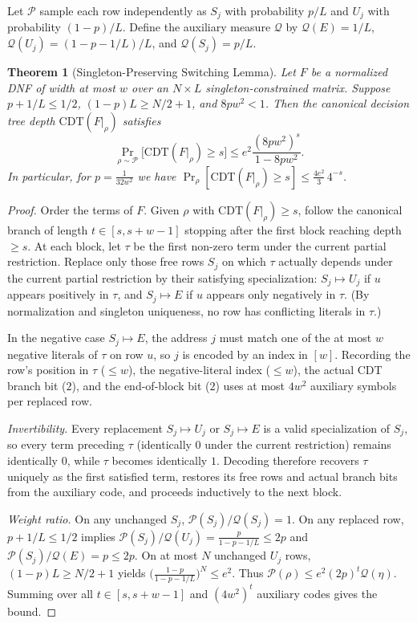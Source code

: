 \documentclass[11pt,a4paper]{article}
\newtheorem{theorem}{Theorem}[section]
\theoremstyle{definition}
\theoremstyle{remark}
\newcommand{\CDT}{\mathrm{CDT}}
\newcommand{\Prb}{\Pr}
\begin{document}
Let $\mathcal{P}$ sample each row independently as $S_j$ with probability $p/L$ and $U_j$ with probability $(1-p)/L$. Define the auxiliary measure $\mathcal{Q}$ by $\mathcal{Q}(E) = 1/L$, $\mathcal{Q}(U_j) = (1 - p - 1/L)/L$, and $\mathcal{Q}(S_j) = p/L$.

\begin{theorem}[Singleton-Preserving Switching Lemma]
\label{thm:singleton-switching}
Let $F$ be a normalized DNF of width at most $w$ over an $N \times L$ singleton-constrained matrix. Suppose $p + 1/L \le 1/2$, $(1 - p)L \ge N/2 + 1$, and $8pw^2 < 1$. Then the canonical decision tree depth $\CDT(F|_\rho)$ satisfies
\[
  \Prb_{\rho \sim \mathcal{P}}\bigl[\CDT(F|_\rho) \ge s\bigr]
  \le e^2 \frac{(8pw^2)^s}{1 - 8pw^2}.
\]
In particular, for $p = \frac{1}{32w^2}$ we have $\Prb_\rho[\CDT(F|_\rho) \ge s] \le \frac{4e^2}{3}\, 4^{-s}$.
\end{theorem}

\begin{proof}
Order the terms of $F$. Given $\rho$ with $\CDT(F|_\rho) \ge s$, follow the canonical branch of length $t \in [s, s+w-1]$ stopping after the first block reaching depth $\ge s$. At each block, let $\tau$ be the first non-zero term under the current partial restriction. Replace only those free rows $S_j$ on which $\tau$ actually depends under the current partial restriction by their satisfying specialization: $S_j \mapsto U_j$ if $u$ appears positively in $\tau$, and $S_j \mapsto E$ if $u$ appears only negatively in $\tau$. (By normalization and singleton uniqueness, no row has conflicting literals in $\tau$.)

In the negative case $S_j \mapsto E$, the address $j$ must match one of the at most $w$ negative literals of $\tau$ on row $u$, so $j$ is encoded by an index in $[w]$. Recording the row's position in $\tau$ ($\le w$), the negative-literal index ($\le w$), the actual CDT branch bit ($2$), and the end-of-block bit ($2$) uses at most $4w^2$ auxiliary symbols per replaced row.

\emph{Invertibility.} Every replacement $S_j \mapsto U_j$ or $S_j \mapsto E$ is a valid specialization of $S_j$, so every term preceding $\tau$ (identically $0$ under the current restriction) remains identically $0$, while $\tau$ becomes identically $1$. Decoding therefore recovers $\tau$ uniquely as the first satisfied term, restores its free rows and actual branch bits from the auxiliary code, and proceeds inductively to the next block.

\emph{Weight ratio.} On any unchanged $S_j$, $\mathcal{P}(S_j)/\mathcal{Q}(S_j) = 1$. On any replaced row, $p + 1/L \le 1/2$ implies $\mathcal{P}(S_j)/\mathcal{Q}(U_j) = \frac{p}{1 - p - 1/L} \le 2p$ and $\mathcal{P}(S_j)/\mathcal{Q}(E) = p \le 2p$. On at most $N$ unchanged $U_j$ rows, $(1-p)L \ge N/2 + 1$ yields $\bigl(\frac{1-p}{1-p-1/L}\bigr)^N \le e^2$. Thus $\mathcal{P}(\rho) \le e^2 (2p)^t \mathcal{Q}(\eta)$. Summing over all $t \in [s, s+w-1]$ and $(4w^2)^t$ auxiliary codes gives the bound.
\end{proof}
\end{document}
